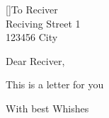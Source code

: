 \documentclass[
    version=last,
    fromemail=true,
    parskip=full,
    fromalign=right,
    fromphone=true,
    fromrule=aftername,
    ]{scrlttr2}
\begin{document}
\begin{letter}[]{To Reciver\\
        Reciving Street 1\\
        123456 City}
    \opening{Dear Reciver,}

    This is a letter for you


    \closing{With best Whishes}



\end{letter}
\end{document}
